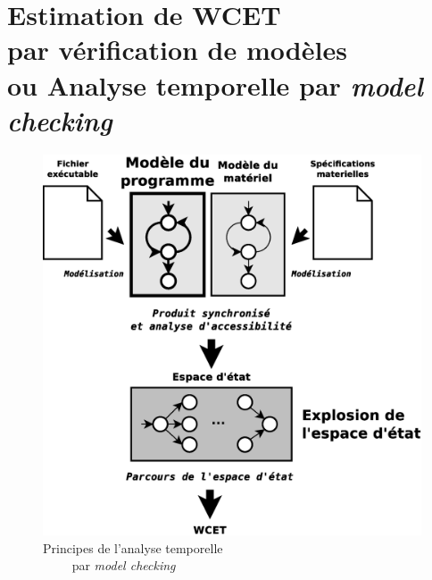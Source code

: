 \documentclass[final]{beamer}
\begin{document}
\begin{frame}
\begin{columns}[t]
      \begin{column}{.45\linewidth}
        \section{Estimation de WCET \\
          par vérification de modèles \\
          {\small ou Analyse temporelle par \emph{model checking}}}
        \begin{figure}
          \centering
          \captionsetup{justification=centering}
          \includegraphics[scale=.66]{img/model-checking.eps}
          \caption{Principes de l'analyse temporelle \\
            ~~~~ par \emph{model checking}}
          \label{fig:analyse}
        \end{figure}
      \end{column}
    \end{columns}


\end{frame}
\end{document}
